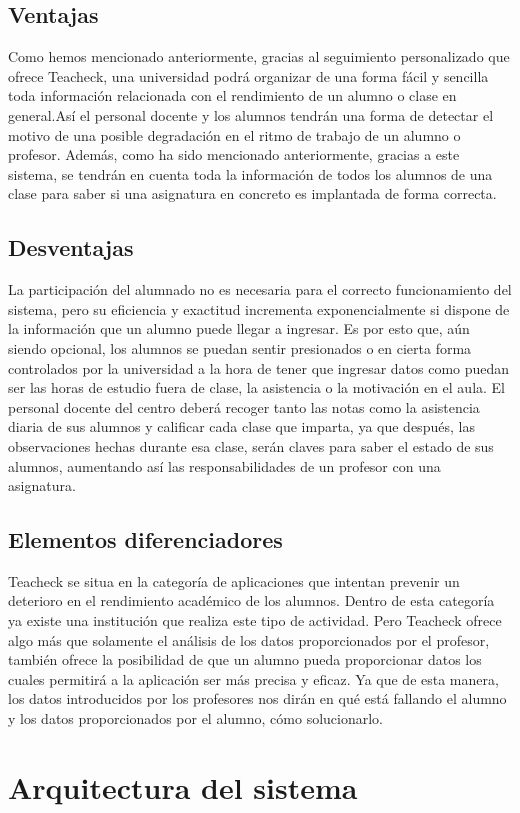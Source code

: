 \subsection{Ventajas}
Como hemos mencionado anteriormente, gracias al seguimiento personalizado que ofrece Teacheck, una universidad podrá organizar de una forma fácil y sencilla toda información relacionada con el rendimiento de un alumno o clase en general.Así el  personal docente y los alumnos tendrán una forma de detectar el motivo de una posible degradación en el ritmo de trabajo de un alumno o profesor.
Además, como ha sido mencionado anteriormente, gracias a este sistema, se tendrán en cuenta toda la información de todos los alumnos de una clase para saber si una asignatura en concreto es implantada de forma correcta.
\subsection{Desventajas}
La participación del alumnado no es necesaria para el correcto funcionamiento del sistema, pero su eficiencia y exactitud incrementa exponencialmente si dispone de la información que un alumno puede llegar a ingresar. Es por esto que, aún siendo opcional, los alumnos se puedan sentir presionados o en cierta forma controlados por la universidad a la hora de tener que ingresar datos como puedan ser las horas de estudio fuera de clase, la asistencia o la motivación en el aula.
El personal docente del centro deberá recoger tanto las notas como la asistencia diaria de sus alumnos y calificar cada clase que imparta, ya que después, las observaciones hechas durante esa clase, serán claves para saber el estado de sus alumnos, aumentando así las responsabilidades de un profesor con una asignatura.
\subsection{Elementos diferenciadores}
Teacheck se situa en la categoría de aplicaciones que intentan prevenir un deterioro en el rendimiento académico de los alumnos. Dentro de esta categoría ya existe una institución que realiza este tipo de actividad. Pero Teacheck ofrece algo más que solamente el análisis de los datos proporcionados por el profesor, también ofrece la posibilidad de que un alumno pueda proporcionar datos los cuales permitirá a la aplicación ser más precisa y eficaz.
Ya que de esta manera, los datos introducidos por los profesores nos dirán en qué está fallando el alumno y los datos proporcionados por el alumno, cómo solucionarlo.
\section{Arquitectura del sistema}
